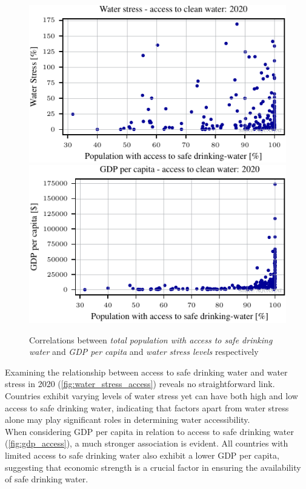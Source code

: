 \documentclass{article}
\theoremstyle{plain}
\theoremstyle{definition}
\theoremstyle{remark}
\begin{document}
\begin{figure}[!ht]
    \centering
    \includegraphics{fig/fig_Water stress - access to clean water: 2020.pdf}
    \includegraphics{fig/fig_GDP per capita - access to clean water: 2020.pdf}
    \caption{Correlations between \textit{total population with access to safe drinking water} and \textit{GDP per capita} and \textit{water stress levels} respectively}
    \label{fig:water_stress_access}
    \label{fig:gdp_access}
\end{figure}
Examining the relationship between access to safe drinking water and water stress in 2020 (\autoref{fig:water_stress_access}) reveals no straightforward link. Countries exhibit varying levels of water stress yet can have both high and low access to safe drinking water, indicating that factors apart from water stress alone may play significant roles in determining water accessibility.\\
When considering GDP per capita in relation to access to safe drinking water (\autoref{fig:gdp_access}), a much stronger association is evident. All countries with limited access to safe drinking water also exhibit a lower GDP per capita, suggesting that economic strength is a crucial factor in ensuring the availability of safe drinking water.
\end{document}

